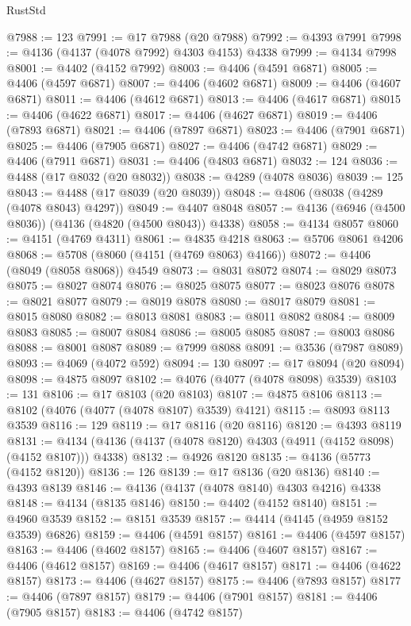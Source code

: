 \begin{lexlean}{RustStd}
\begin{coremodule}
{\begin{coremodule}
{{{{{{{{{{{{{{{{{{{{{{{{{{{{{{{{{{{{{{{{{{{{{{{{{{@7988 := 123
@7991 := @17 @7988 (@20 @7988)
@7992 := @4393 @7991
@7998 := @4136 (@4137 (@4078 @7992) @4303 @4153) @4338
@7999 := @4134 @7998
@8001 := @4402 (@4152 @7992)
@8003 := @4406 (@4591 @6871)
@8005 := @4406 (@4597 @6871)
@8007 := @4406 (@4602 @6871)
@8009 := @4406 (@4607 @6871)
@8011 := @4406 (@4612 @6871)
@8013 := @4406 (@4617 @6871)
@8015 := @4406 (@4622 @6871)
@8017 := @4406 (@4627 @6871)
@8019 := @4406 (@7893 @6871)
@8021 := @4406 (@7897 @6871)
@8023 := @4406 (@7901 @6871)
@8025 := @4406 (@7905 @6871)
@8027 := @4406 (@4742 @6871)
@8029 := @4406 (@7911 @6871)
@8031 := @4406 (@4803 @6871)
@8032 := 124
@8036 := @4488 (@17 @8032 (@20 @8032))
@8038 := @4289 (@4078 @8036)
@8039 := 125
@8043 := @4488 (@17 @8039 (@20 @8039))
@8048 := @4806 (@8038 (@4289 (@4078 @8043) @4297))
@8049 := @4407 @8048
@8057 := @4136 (@6946 (@4500 @8036)) (@4136 (@4820 (@4500 @8043)) @4338)
@8058 := @4134 @8057
@8060 := @4151 (@4769 @4311)
@8061 := @4835 @4218
@8063 := @5706 @8061 @4206
@8068 := @5708 (@8060 (@4151 (@4769 @8063) @4166))
@8072 := @4406 (@8049 (@8058 @8068)) @4549
@8073 := @8031 @8072
@8074 := @8029 @8073
@8075 := @8027 @8074
@8076 := @8025 @8075
@8077 := @8023 @8076
@8078 := @8021 @8077
@8079 := @8019 @8078
@8080 := @8017 @8079
@8081 := @8015 @8080
@8082 := @8013 @8081
@8083 := @8011 @8082
@8084 := @8009 @8083
@8085 := @8007 @8084
@8086 := @8005 @8085
@8087 := @8003 @8086
@8088 := @8001 @8087
@8089 := @7999 @8088
@8091 := @3536 (@7987 @8089)
@8093 := @4069 (@4072 @592)
@8094 := 130
@8097 := @17 @8094 (@20 @8094)
@8098 := @4875 @8097
@8102 := @4076 (@4077 (@4078 @8098) @3539)
@8103 := 131
@8106 := @17 @8103 (@20 @8103)
@8107 := @4875 @8106
@8113 := @8102 (@4076 (@4077 (@4078 @8107) @3539) @4121)
@8115 := @8093 @8113 @3539
@8116 := 129
@8119 := @17 @8116 (@20 @8116)
@8120 := @4393 @8119
@8131 := @4134 (@4136 (@4137 (@4078 @8120) @4303 (@4911 (@4152 @8098) (@4152 @8107))) @4338)
@8132 := @4926 @8120
@8135 := @4136 (@5773 (@4152 @8120))
@8136 := 126
@8139 := @17 @8136 (@20 @8136)
@8140 := @4393 @8139
@8146 := @4136 (@4137 (@4078 @8140) @4303 @4216) @4338
@8148 := @4134 (@8135 @8146)
@8150 := @4402 (@4152 @8140)
@8151 := @4960 @3539
@8152 := @8151 @3539
@8157 := @4414 (@4145 (@4959 @8152 @3539) @6826)
@8159 := @4406 (@4591 @8157)
@8161 := @4406 (@4597 @8157)
@8163 := @4406 (@4602 @8157)
@8165 := @4406 (@4607 @8157)
@8167 := @4406 (@4612 @8157)
@8169 := @4406 (@4617 @8157)
@8171 := @4406 (@4622 @8157)
@8173 := @4406 (@4627 @8157)
@8175 := @4406 (@7893 @8157)
@8177 := @4406 (@7897 @8157)
@8179 := @4406 (@7901 @8157)
@8181 := @4406 (@7905 @8157)
@8183 := @4406 (@4742 @8157)
}}}}}}}}}}}}}}}}}}}}}}}}}}}}}}}}}}}}}}}}}}}}}}}}}}
\end{coremodule}}
\end{coremodule}
\end{lexlean}

